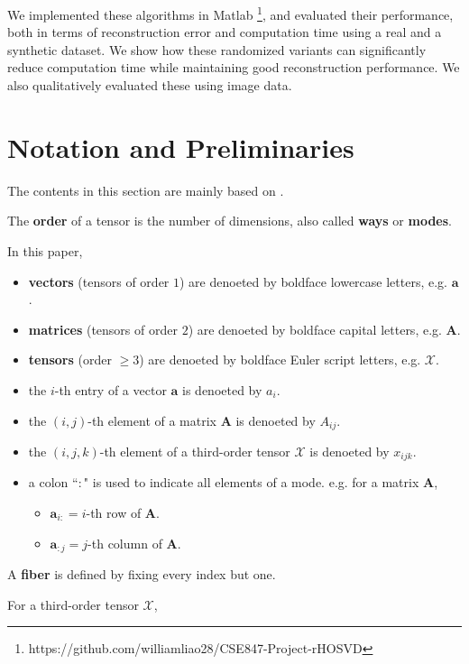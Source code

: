 \documentclass[preprint]{elsarticle}
\begin{document}
We implemented these algorithms in Matlab \footnote{https://github.com/williamliao28/CSE847-Project-rHOSVD}, and evaluated their performance, both in terms of reconstruction error and computation time using a real and a synthetic dataset. We show how these randomized variants can significantly reduce computation time while maintaining good reconstruction performance. We also qualitatively evaluated these using image data.


\section{Notation and Preliminaries}
\noindent The contents in this section are mainly based on \cite{Kolda2009}.
\begin{defn}
    The \textbf{order} of a tensor is the number of dimensions, also called \textbf{ways} or \textbf{modes}.
\end{defn}
In this paper,
\begin{itemize}
    \item \textbf{vectors} (tensors of order $1$) are denoeted by boldface lowercase letters, e.g. $\mathbf{a}$.
    \item \textbf{matrices} (tensors of order $2$) are denoeted by boldface capital letters, e.g. $\mathbf{A}$.
    \item \textbf{tensors} (order $\geq 3$) are denoeted by boldface Euler script letters, e.g. $\boldsymbol{\mathscr{X}}$.
    \item the $i$-th entry of a vector $\mathbf{a}$ is denoeted by $a_i$.
    \item the $(i,j)$-th element of a matrix $\mathbf{A}$ is denoeted by $A_{ij}$.
    \item the $(i,j,k)$-th element of a third-order tensor $\boldsymbol{\mathscr{X}}$ is denoeted by $x_{ijk}$.
    \item a colon ``$:$" is used to indicate all elements of a mode. e.g. for a matrix $\mathbf{A}$,
    \begin{itemize}
        \item $\mathbf{a}_{i:} = i$-th row of $\mathbf{A}$.
        \item $\mathbf{a}_{:j} = j$-th column of $\mathbf{A}$.
    \end{itemize}
\end{itemize}
\begin{defn}
    A \textbf{fiber} is defined by fixing every index but one.
\end{defn}
For a third-order tensor $\boldsymbol{\mathscr{X}}$,
\end{document}
